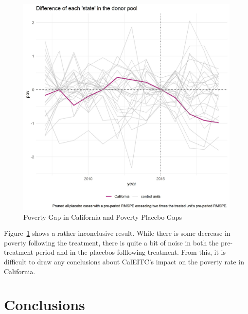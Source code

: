 \documentclass{article}
\begin{document}
 \begin{figure}[H]
    \caption{Poverty Gap in California and Poverty Placebo Gaps}
    \begin{center}
        \includegraphics[width=.85\textwidth]{ca_pov_placebos}
    \end{center}
    \label{fig:ca_pov_placebos}{}
\end{figure}

Figure~\ref{fig:ca_pov_placebos} shows a rather inconclusive result. While there is some decrease in poverty following the treatment, there is quite a bit of noise in both the pre-treatment period and in the placebos folllowing treatment. From this, it is difficult to draw any conclusions about CalEITC's impact on the poverty rate in California. 

\section{Conclusions}

{}

\end{document}
